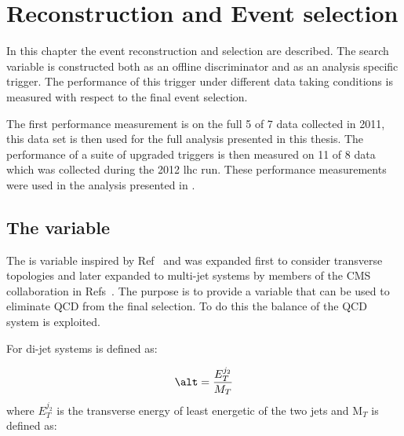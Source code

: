 




\chapter{Reconstruction and Event selection} %
\label{cha:the_t_analysis}
In this chapter the event reconstruction and selection are described. The search variable \alt is constructed both as an offline discriminator and as an 
analysis specific trigger. The performance of this trigger under different data 
taking conditions is measured with respect to the final event selection.

The first performance measurement is on the full \unit{5}{\invfb} of 
\unit{7}{\TeV} data collected in 2011, this data set is then used for the full 
analysis presented in this thesis. The performance of a suite of upgraded \alt 
triggers is then measured on \unit{11}{\invfb} of \unit{8}{\TeV} data which was 
collected during the 2012 \ac{lhc} run. These performance measurements were 
used in the analysis presented in \cite{Chatrchyan:2012wa}.


\section{The \alt variable} %
\label{sec:the_alpha___t_variable_}
The \alt is variable inspired by Ref~\cite{Randall:2008dk} and was expanded first to consider transverse topologies and later expanded to  multi-jet systems by members of the CMS collaboration in 
Refs~\cite{cms-pas-sus-08005,cms-pas-sus-09001}. The purpose is to provide a 
variable that can be used to eliminate QCD from the final selection. To do 
this the balance of the QCD system is exploited.

For di-jet systems \alt is defined as:

\begin{equation}
  \alt = \frac{E_{T}^{j_{2}}}{M_{T}}
\end{equation}
where $E_{T}^{j_{2}}$ is the transverse energy of least energetic of the two 
jets and M$_{T}$ is defined as:

